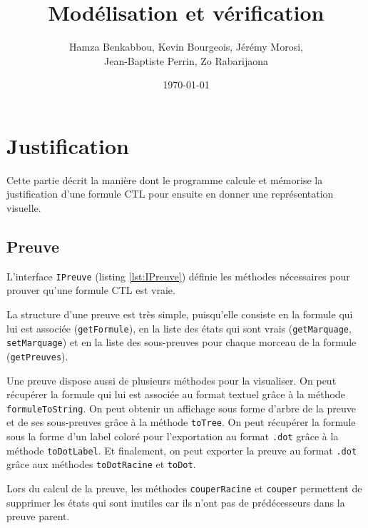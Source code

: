 \documentclass[dvipsnames]{report}
\begin{document}
\title{Modélisation et vérification}   %
\author{Hamza Benkabbou, Kevin Bourgeois, Jérémy Morosi,\\Jean-Baptiste Perrin, Zo Rabarijaona}         %
\date{\today}    %
\maketitle

\tableofcontents

\newpage

\section{Justification}

Cette partie décrit la manière dont le programme calcule et mémorise la justification d'une formule CTL pour ensuite en donner une représentation visuelle.

\subsection{Preuve}

L'interface \texttt{IPreuve} (listing \ref{lst:IPreuve}) définie les méthodes nécessaires pour prouver qu'une formule CTL est vraie. 

La structure d'une preuve est très simple, puisqu'elle consiste en la formule qui lui est associée (\texttt{getFormule}), en la liste des états qui sont vrais (\texttt{getMarquage}, \texttt{setMarquage}) et en la liste des sous-preuves pour chaque morceau de la formule (\texttt{getPreuves}).

Une preuve dispose aussi de plusieurs méthodes pour la visualiser. On peut récupérer la formule qui lui est associée au format textuel grâce à la méthode \texttt{formuleToString}. On peut obtenir un affichage sous forme d'arbre de la preuve et de ses sous-preuves grâce à la méthode \texttt{toTree}. On peut récupérer la formule sous la forme d'un label coloré pour l'exportation au format \texttt{.dot} grâce à la méthode \texttt{toDotLabel}. Et finalement, on peut exporter la preuve au format \texttt{.dot} grâce aux méthodes \texttt{toDotRacine} et \texttt{toDot}.

Lors du calcul de la preuve, les méthodes \texttt{couperRacine} et \texttt{couper} permettent de supprimer les états qui sont inutiles car ils n'ont pas de prédécesseurs dans la preuve parent.
\end{document}
